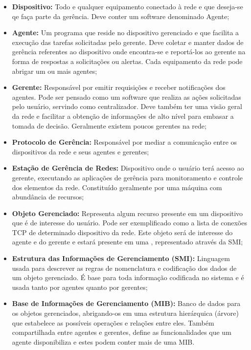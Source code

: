 \documentclass[twoside,english,brazilian]{UNISINOSmonografia}
\begin{document}
\begin{itemize}

\item \textbf{Dispositivo:}
	Todo e qualquer equipamento conectado à rede e que deseja-se qe faça parte
da gerência. 
Deve conter um software denominado Agente;

\item \textbf{Agente:}
	Um programa que reside no dispositivo gerenciado e que facilita a execução
das tarefas solicitadas pelo gerente. 
Deve coletar e manter dados de gerência referentes ao dispositivo onde 
encontra-se e reportá-los ao gerente na forma de respostas a solicitações ou 
alertas.
Cada equipamento da rede pode abrigar um ou mais agentes;
	
\item \textbf{Gerente:}
	Responsável por emitir requisições e receber notificações dos agentes.
Pode ser pensado como um software que realiza as ações solicitadas pelo 
usuário, servindo como centralizador.
Deve também ter uma visão geral da rede e facilitar a obtenção de informações 
de alto nível para embasar a tomada de decisão.
Geralmente existem poucos gerentes na rede;

\item \textbf{Protocolo de Gerência:}
	Responsável por mediar a comunicação entre os dispositivos da rede e seus 
agentes e gerentes;

\item \textbf{Estação de Gerência de Redes:}
	Dispositivo onde o usuário terá acesso ao gerente, executando as 
aplicações de gerência para monitoramento e controle dos elementos da rede.
Constituído geralmente por uma máquina com abundância de recursos;

\item \textbf{Objeto Gerenciado:}
	Representa algum recurso presente em um dispositivo que é de interesse do 
usuário.
Pode ser exemplificado como a lista de conexões TCP de determinado dispositivo 
da rede.
Este objeto será de interesse do agente e do gerente e estará presente em uma 
, representado através da SMI;

\item \textbf{Estrutura das Informações de Gerenciamento (SMI):}
	Linguagem usada para descrever as regras de nomenclatura e codificação 
dos dados de um objeto gerenciado. 
É base para toda informação codificada no sistema e é usada tanto por agentes 
quanto por gerentes;

\item \textbf{Base de Informações de Gerenciamento (MIB):}
	Banco de dados para os objetos gerenciados, abrigando-os em uma estrutura 
hierárquica (árvore) que estabelece as possíveis operações e relações entre 
eles.
Também compartilhada entre agentes e gerentes, define as funcionalidades que 
um agente disponibiliza e estes podem conter mais de uma MIB.

\end{itemize}
\end{document}
